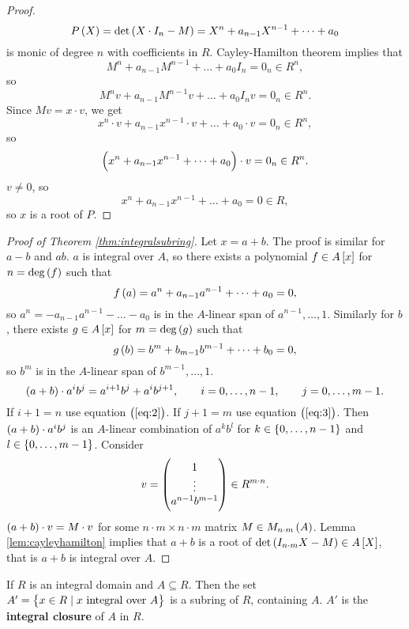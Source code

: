 \begin{proof}
$$ P\br{X} = \det\br{X \cdot I_n - M} = X^n + a_{n - 1}X^{n - 1} + \dots + a_0 $$
is monic of degree $ n $ with coefficients in $ R $. Cayley-Hamilton theorem implies that
$$ M^n + a_{n - 1}M^{n - 1} + \dots + a_0I_n = 0_n \in R^n, $$
so
$$ M^nv + a_{n - 1}M^{n - 1}v + \dots + a_0I_nv = 0_n \in R^n. $$
Since $ Mv = x \cdot v $, we get
$$ x^n \cdot v + a_{n - 1}x^{n - 1} \cdot v + \dots + a_0 \cdot v = 0_n \in R^n, $$
so
$$ \br{x^n + a_{n - 1}x^{n - 1} + \dots + a_0} \cdot v = 0_n \in R^n. $$
$ v \ne 0 $, so
$$ x^n + a_{n - 1}x^{n - 1} + \dots + a_0 = 0 \in R, $$
so $ x $ is a root of $ P $.
\end{proof}

\pagebreak

\begin{proof}[Proof of Theorem \ref{thm:integralsubring}]
Let $ x = a + b $. The proof is similar for $ a - b $ and $ ab $. $ a $ is integral over $ A $, so there exists a polynomial $ f \in A\sbr{x} $ for $ n = \deg\br{f} $ such that
\begin{equation}
\label{eq:2}
f\br{a} = a^n + a_{n - 1}a^{n - 1} + \dots + a_0 = 0,
\end{equation}
so $ a^n = -a_{n - 1}a^{n - 1} - \dots - a_0 $ is in the $ A $-linear span of $ a^{n - 1}, \dots, 1 $. Similarly for $ b $, there exists $ g \in A\sbr{x} $ for $ m = \deg\br{g} $ such that
\begin{equation}
\label{eq:3}
g\br{b} = b^m + b_{m - 1}b^{m - 1} + \dots + b_0 = 0,
\end{equation}
so $ b^m $ is in the $ A $-linear span of $ b^{m - 1}, \dots, 1 $.
$$ \br{a + b} \cdot a^ib^j = a^{i + 1}b^j + a^ib^{j + 1}, \qquad i = 0, \dots, n - 1, \qquad j = 0, \dots, m - 1. $$
If $ i + 1 = n $ use equation $ \br{\ref{eq:2}} $. If $ j + 1 = m $ use equation $ \br{\ref{eq:3}} $. Then $ \br{a + b} \cdot a^ib^j $ is an $ A $-linear combination of $ a^kb^l $ for $ k \in \cbr{0, \dots, n - 1} $ and $ l \in \cbr{0, \dots, m - 1} $. Consider
$$ v = \begin{pmatrix} 1 \\ \vdots \\ a^{n - 1}b^{m - 1} \end{pmatrix} \in R^{m \cdot n}. $$
$ \br{a + b} \cdot v = M \cdot v $ for some $ n \cdot m \times n \cdot m $ matrix $ M \in M_{n \cdot m}\br{A} $. Lemma \ref{lem:cayleyhamilton} implies that $ a + b $ is a root of $ \det\br{I_{n \cdot m}X - M} \in A\sbr{X} $, that is $ a + b $ is integral over $ A $.
\end{proof}

\begin{corollary}
If $ R $ is an integral domain and $ A \subseteq R $. Then the set $ A' = \cbr{x \in R \mid x \ \text{integral over} \ A} $ is a subring of $ R $, containing $ A $. $ A' $ is the \textbf{integral closure} of $ A $ in $ R $.
\end{corollary}

